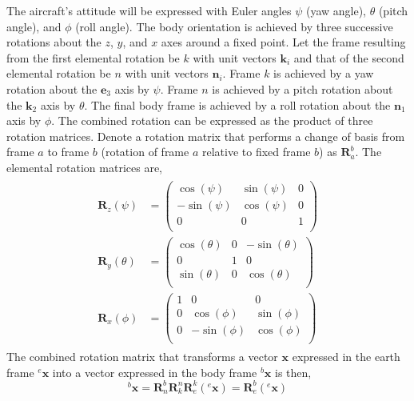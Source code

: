 \documentclass{article}
\begin{document}
	The aircraft's attitude will be expressed with Euler angles $\psi$ (yaw angle), $\theta$ (pitch angle), and $\phi$ (roll angle).  The body orientation is achieved by three successive rotations about the $z$, $y$, and $x$ axes around a fixed point. Let the frame resulting from the first elemental rotation be $k$ with unit vectors $\mathbf{k}_i$ and that of the second elemental rotation be $n$ with unit vectors $\mathbf{n}_i$. Frame $k$ is achieved by a yaw rotation about the $\mathbf{e}_3$ axis by $\psi$. Frame $n$ is achieved by a pitch rotation about the $\mathbf{k}_2$ axis by $\theta$.  The final body frame is achieved by a roll rotation about the $\mathbf{n}_1$ axis by $\phi$.  The combined rotation can be expressed as the product of three rotation matrices.  Denote a rotation matrix that performs a change of basis from frame $a$ to frame $b$ (rotation of frame $a$ relative to fixed frame $b$) as $\mathbf{R}_a^b$. The elemental rotation matrices are,
	\begin{align}
		\begin{split}
		\mathbf{R}_z(\psi) &= 
		\left(
		\begin{array}{ccc}
			\cos (\psi ) & \sin (\psi ) & 0 \\
			-\sin (\psi ) & \cos (\psi ) & 0 \\
			0 & 0 & 1 \\
		\end{array}
		\right)
		\\
		\mathbf{R}_y(\theta) &= 
		\left(
		\begin{array}{ccc}
			\cos (\theta ) & 0 & -\sin (\theta ) \\
			0 & 1 & 0 \\
			\sin (\theta ) & 0 & \cos (\theta ) \\
		\end{array}
		\right)\\
		\mathbf{R}_x(\phi) &= 
		\left(
		\begin{array}{ccc}
			1 & 0 & 0 \\	
			0 & \cos (\phi ) & \sin (\phi ) \\
			0 & -\sin (\phi ) & \cos (\phi ) \\
		\end{array}
		\right)
		\end{split}
	\end{align}
	The combined rotation matrix that transforms a vector $\mathbf{x}$ expressed in the earth frame ${}^e \mathbf{x}$ into a vector expressed in the body frame ${}^b \mathbf{x}$ is then,
	\begin{equation}
		{}^b \mathbf{x} = \mathbf{R}_n^b \mathbf{R}_k^n \mathbf{R}_e^k\left( {}^e \mathbf{x}\right) =\mathbf{R}_e^b\left( {}^e \mathbf{x}\right)
	\end{equation}
\end{document}
